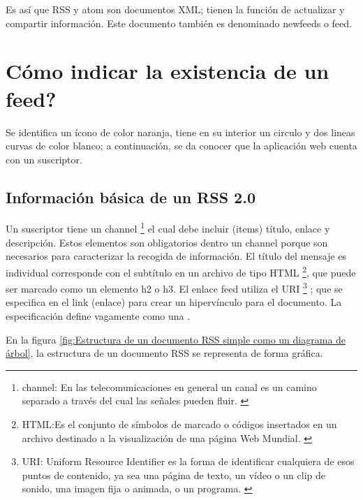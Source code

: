 Es así que RSS y atom son documentos XML; tienen la función de actualizar y
compartir información. Este documento también es denominado newfeeds o feed.
\cite{wittenbrink2005rss}

\section{\textquestiondown Cómo indicar la existencia de un feed?}

Se identifica un ícono de color naranja, tiene en su interior un circulo y
dos lineas curvas de color blanco; a continuación, se da conocer que la
aplicación web cuenta con un suscriptor.

\begin{minipage}{1.0\linewidth}
	\centering
	\label{fig:Ícono representación gráfica de un feed}
\end{minipage}

\subsection{Información básica de un RSS 2.0}

Un suscriptor tiene un channel \footnote{channel: En las telecomunicaciones
en general un canal es un camino separado a través del cual las señales pueden
fluir. \cite{channel}} el cual debe incluir (items) título, enlace y
descripción. Estos elementos son obligatorios dentro un channel porque son
necesarios para caracterizar la recogida de información. El título del mensaje
es individual corresponde con el subtítulo en un archivo de tipo HTML 
\footnote{HTML:Es el conjunto de símbolos de marcado o códigos insertados en
un archivo destinado a la visualización de una página Web Mundial. \cite{html}},
que puede ser marcado como un elemento h2 o h3. El enlace feed utiliza el URI
\footnote{URI: Uniform Resource Identifier es la forma de identificar
cualquiera de esos puntos de contenido, ya sea una página de texto, un vídeo
o un clip de sonido, una imagen fija o animada, o un programa. \cite{uri}}
; que se especifica en el link (enlace) para crear un hipervínculo para el
documento. La especificación define vagamente como una . \cite{wittenbrink2005rss}

En la figura \ref{fig:Estructura de un documento RSS simple como un diagrama de árbol},
la estructura de un documento RSS se representa de forma gráfica.

